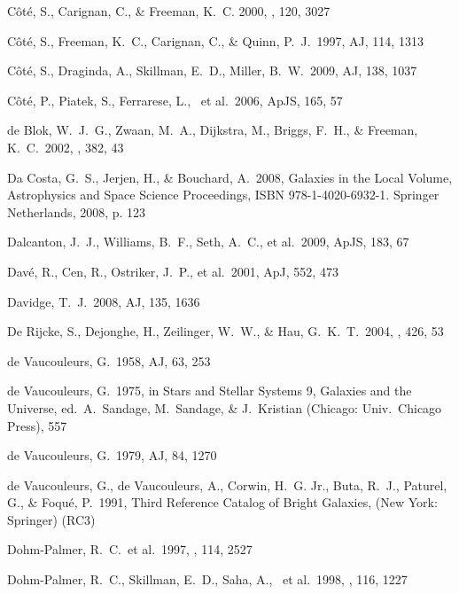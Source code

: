 \documentclass[12pt,onecolumn]{emulateapj}
\begin{document}
\begin{thebibliography}{}
C\^ot\'e, S., Carignan, C., \& Freeman, K.~C. 2000, \aj , 120, 3027

C\^ot\'e, S., Freeman, K.~C., Carignan, C., \& Quinn, P.~J.\ 1997, AJ, 114, 1313

C\^ot\'e, S., Draginda, A., Skillman, E.~D., Miller, B.~W.\ 2009, AJ, 138, 1037

C\^ot\'e, P., Piatek, S., Ferrarese, L., ~et al.\ 2006, ApJS, 165, 57

 de Blok, W.~J.~G., 
Zwaan, M.~A., Dijkstra, M., Briggs, F.~H., \& Freeman, K.~C.\ 2002, \aap, 
382, 43 

Da Costa, G.~S., Jerjen, H., \& Bouchard, A.\ 2008, Galaxies in the Local Volume, 
Astrophysics and Space Science Proceedings, ISBN 978-1-4020-6932-1. 
Springer Netherlands, 2008, p. 123

Dalcanton, J.~J., Williams, B.~F., Seth, A.~C., et al.\ 2009, ApJS, 183, 67 

Dav\'e, R., Cen, R., Ostriker, J.~P., et al.\ 2001, ApJ, 552, 473

Davidge, T.~J.\ 2008, AJ, 135, 1636

De Rijcke, S., Dejonghe, H., Zeilinger, W.~W., \& Hau, G.~K.~T.\ 2004, \aap, 426, 53 

de Vaucouleurs, G.\ 1958, AJ, 63, 253

de Vaucouleurs, G.\ 1975, in Stars and Stellar Systems 9, Galaxies
and the Universe, ed.\ A.\ Sandage, M.\ Sandage, \& J.\ Kristian
(Chicago: Univ.\ Chicago Press), 557

de Vaucouleurs, G.\ 1979, AJ, 84, 1270

de Vaucouleurs, G., de Vaucouleurs, A., Corwin, H.~G. Jr.,
Buta, R.~J., Paturel, G., \& Foqu\'e, P.\ 1991, Third Reference
Catalog of Bright Galaxies, (New York: Springer) (RC3)

Dohm-Palmer, R.~C.~et al.\ 1997, \aj, 114, 2527 

Dohm-Palmer, R.~C., Skillman, E.~D., Saha, A., ~et al.\ 1998, \aj, 116, 1227 


\end{thebibliography}
\end{document}
